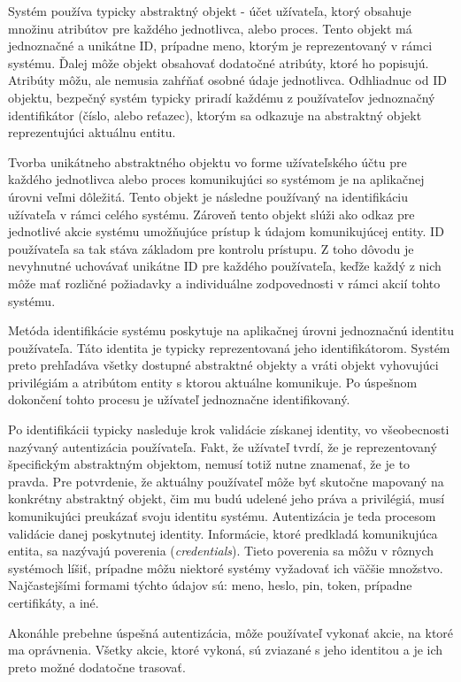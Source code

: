 \documentclass[
  digital, %
  table,   %
  lof,     %
  nolot,   %
  nocover
]{fithesis3}
\begin{document}
Systém používa typicky
abstraktný objekt - účet užívateľa, ktorý obsahuje množinu atribútov pre
každého jednotlivca, alebo proces. Tento objekt má jednoznačné a unikátne
ID, prípadne meno, ktorým je reprezentovaný v rámci systému. Ďalej môže objekt
obsahovať dodatočné atribúty, ktoré ho popisujú. Atribúty môžu, ale nemusia
zahŕňať osobné údaje jednotlivca. Odhliadnuc od ID objektu, bezpečný systém
typicky priradí každému z používateľov jednoznačný identifikátor (číslo, alebo
reťazec), ktorým sa odkazuje na abstraktný objekt reprezentujúci aktuálnu
entitu. 

Tvorba unikátneho abstraktného objektu vo forme užívateľského účtu
pre každého jednotlivca alebo proces komunikujúci so systémom je na aplikačnej
úrovni veľmi dôležitá. Tento objekt je následne používaný na identifikáciu
užívateľa v rámci celého systému. Zároveň tento objekt slúži ako odkaz pre
jednotlivé akcie systému umožňujúce prístup k údajom komunikujúcej entity.
ID používateľa sa tak stáva základom pre kontrolu prístupu. Z toho dôvodu je 
nevyhnutné uchovávať unikátne ID pre každého používateľa, keďže každý z nich
môže mať rozličné požiadavky a individuálne zodpovednosti v rámci akcií tohto
systému.

Metóda identifikácie systému poskytuje na aplikačnej úrovni jednoznačnú
identitu používateľa. Táto identita je typicky reprezentovaná jeho
identifikátorom. Systém preto prehľadáva všetky dostupné abstraktné objekty a
vráti objekt vyhovujúci privilégiám a atribútom entity s ktorou aktuálne
komunikuje. Po úspešnom dokončení tohto procesu je užívateľ jednoznačne
identifikovaný.

Po identifikácii typicky nasleduje krok validácie získanej identity,
vo všeobecnosti nazývaný autentizácia používateľa. Fakt, že užívateľ tvrdí,
že je reprezentovaný špecifickým abstraktným objektom, nemusí totiž nutne
znamenať, že je to pravda. Pre potvrdenie, že aktuálny používateľ môže byť
skutočne mapovaný na konkrétny abstraktný objekt, čim mu budú udelené jeho
práva a privilégiá, musí komunikujúci preukázať svoju identitu systému.
Autentizácia je teda procesom validácie danej poskytnutej identity. Informácie,
ktoré predkladá komunikujúca entita, sa nazývajú poverenia
(\textit{credentials}). Tieto poverenia sa môžu v rôznych systémoch líšiť, 
prípadne môžu niektoré systémy vyžadovať ich väčšie množstvo. Najčastejšími
formami týchto údajov sú: meno, heslo, pin, token, prípadne certifikáty, a iné.

Akonáhle prebehne úspešná autentizácia, môže používateľ vykonať akcie, na ktoré
ma oprávnenia. Všetky akcie, ktoré vykoná, sú zviazané s jeho identitou a je ich
preto možné dodatočne trasovať.
\end{document}
